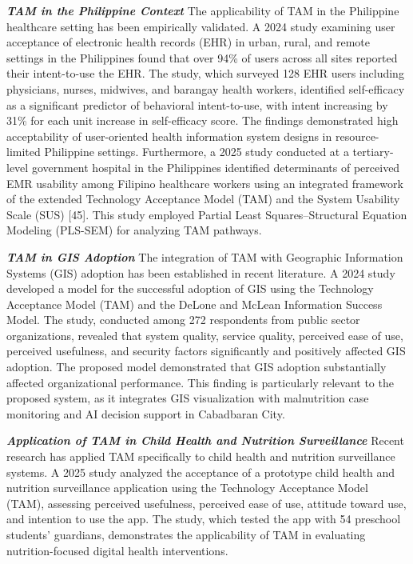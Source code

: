\documentclass[12pt, a4paper]{report}
\begin{document}
\noindent \textbf{\textit{TAM in the Philippine Context}}
The applicability of TAM in the Philippine healthcare setting has been empirically validated. A 2024 study examining user acceptance of electronic health records (EHR) in urban, rural, and remote settings in the Philippines found that over 94\% of users across all sites reported their intent-to-use the EHR. The study, which surveyed 128 EHR users including physicians, nurses, midwives, and barangay health workers, identified self-efficacy as a significant predictor of behavioral intent-to-use, with intent increasing by 31\% for each unit increase in self-efficacy score. The findings demonstrated high acceptability of user-oriented health information system designs in resource-limited Philippine settings.
Furthermore, a 2025 study conducted at a tertiary-level government hospital in the Philippines identified determinants of perceived EMR usability among Filipino healthcare workers using an integrated framework of the extended Technology Acceptance Model (TAM) and the System Usability Scale (SUS) [45]. This study employed Partial Least Squares--Structural Equation Modeling (PLS-SEM) for analyzing TAM pathways.

\noindent \textbf{\textit{TAM in GIS Adoption}}
The integration of TAM with Geographic Information Systems (GIS) adoption has been established in recent literature. A 2024 study developed a model for the successful adoption of GIS using the Technology Acceptance Model (TAM) and the DeLone and McLean Information Success Model. The study, conducted among 272 respondents from public sector organizations, revealed that system quality, service quality, perceived ease of use, perceived usefulness, and security factors significantly and positively affected GIS adoption. The proposed model demonstrated that GIS adoption substantially affected organizational performance. This finding is particularly relevant to the proposed system, as it integrates GIS visualization with malnutrition case monitoring and AI decision support in Cabadbaran City.

\noindent \textbf{\textit{Application of TAM in Child Health and Nutrition Surveillance}}
Recent research has applied TAM specifically to child health and nutrition surveillance systems. A 2025 study analyzed the acceptance of a prototype child health and nutrition surveillance application using the Technology Acceptance Model (TAM), assessing perceived usefulness, perceived ease of use, attitude toward use, and intention to use the app. The study, which tested the app with 54 preschool students' guardians, demonstrates the applicability of TAM in evaluating nutrition-focused digital health interventions.
\end{document}

